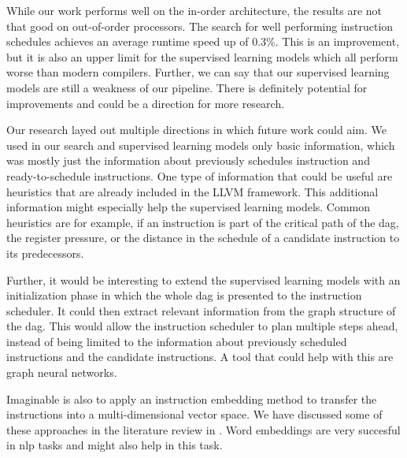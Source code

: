 While our work performs well on the in-order architecture, the results are not that good on out-of-order processors.
The search for well performing instruction schedules achieves an average runtime speed up of 0.3\%.
This is an improvement, but it is also an upper limit for the supervised learning models which all perform worse than modern compilers.
Further, we can say that our supervised learning models are still a weakness of our pipeline.
There is definitely potential for improvements and could be a direction for more research.
 
Our research layed out multiple directions in which future work could aim.
We used in our search and supervised learning models only basic information, which was mostly just the information about previously schedules instruction and ready-to-schedule instructions.
One type of information that could be useful are heuristics that are already included in the LLVM framework.
This additional information might especially help the supervised learning models.
Common heuristics are for example, if an instruction is part of the critical path of the \ac{dag}, the register pressure, or the distance in the schedule of a candidate instruction to its predecessors.

Further, it would be interesting to extend the supervised learning models with an initialization phase in which the whole \ac{dag} is presented to the instruction scheduler.
It could then extract relevant information from the graph structure of the \ac{dag}.
This would allow the instruction scheduler to plan multiple steps ahead, instead of being limited to the information about previously scheduled instructions and the candidate instructions.
A tool that could help with this are graph neural networks.

Imaginable is also to apply an instruction embedding method to transfer the instructions into a multi-dimensional vector space.
We have discussed some of these approaches in the literature review in .
Word embeddings are very succesful in \ac{nlp} tasks and might also help in this task.








